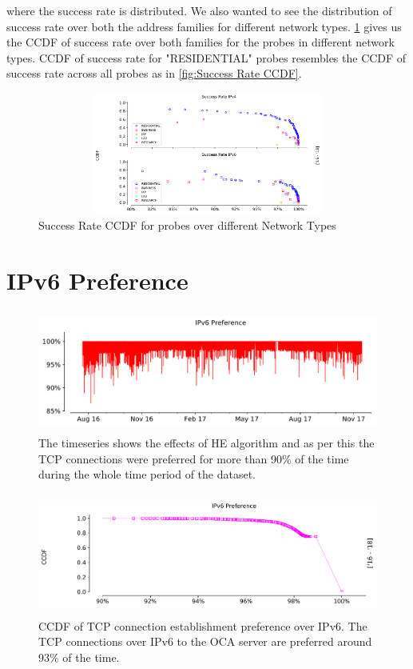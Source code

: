 where the success rate is distributed. We also wanted to see the distribution of success rate over both the address families for different network types. 
\cref{fig:Success Rate CCDF for probes over different Network Types} gives us the CCDF of success rate over both families for the probes in different
network types. CCDF of success rate for "RESIDENTIAL" probes resembles the CCDF of success rate across all probes as in \cref{fig:Success Rate CCDF}.
\begin{figure}[!ht]
	\centering
	\includegraphics[keepaspectratio, height=4cm, width=15cm]{figures/success/netflix-success-rate-ccdf-type.pdf}
	\caption{Success Rate CCDF for probes over different Network Types}
	\label{fig:Success Rate CCDF for probes over different Network Types}
\end{figure}
\vfill
\FloatBarrier

\section{IPv6 Preference}\label{chapter:ipv6preference}
\begin{figure}[!ht]
	\centering
	\includegraphics[keepaspectratio, height=4cm, width=15cm]{figures/preference/he-preference-timeseries.pdf}
	\caption[IPv6 Preference Timeseries]{The timeseries shows the effects of HE algorithm and as per this the TCP connections were preferred for more than 90\% of the time during the whole time period of the dataset.}
	\label{fig:IPv6 Preference Timeseries}
\end{figure}
\begin{figure}[!ht]
	\centering
	\includegraphics[keepaspectratio, height=4cm, width=15cm]{figures/preference/he-preference-ccdf.pdf}
	\caption[IPv6 Perference CCDF]{CCDF of TCP connection establishment preference over IPv6. The TCP connections over IPv6 to the OCA server are preferred around 93\% of the time.}
	\label{fig:IPv6 Preference CCDF}
\end{figure}

